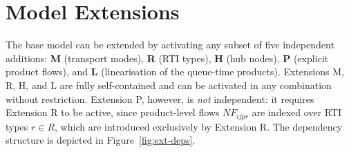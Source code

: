 
\section{Model Extensions}
\label{sec:extensions}

The base model can be extended by activating any subset of five independent
additions: \textbf{M} (transport modes), \textbf{R} (RTI types),
\textbf{H} (hub nodes), \textbf{P} (explicit product flows), and \textbf{L}
(linearisation of the queue-time products).
{Extensions M, R, H, and L are fully self-contained and
can be activated in any combination without restriction.
Extension P, however, is \emph{not} independent: it requires Extension R to
be active, since product-level flows $NF_{ijpr}$ are indexed over RTI
types $r \in R$, which are introduced exclusively by Extension R.
The dependency structure is depicted in Figure~\ref{fig:ext-deps}.}

